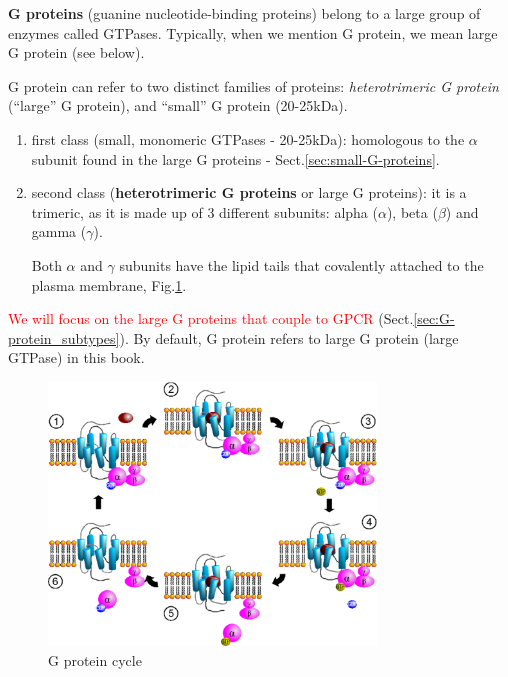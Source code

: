 {\bf G proteins} (guanine nucleotide-binding proteins) belong to a large group
of enzymes called GTPases. Typically, when we mention G protein, we mean
large G protein (see below).

G protein can refer to two distinct families of proteins:
{\it heterotrimeric G protein} (``large'' G protein), and ``small'' G protein
(20-25kDa).

\begin{enumerate}
  \item first class (small, monomeric GTPases - 20-25kDa): homologous to the
  $\alpha$ subunit found in the large G proteins - Sect.\ref{sec:small-G-proteins}.
  
  
  \item second class ({\bf heterotrimeric G proteins} or large G proteins):
  it is a trimeric, as it is made up of 3 different subunits:  alpha ($\alpha$),
  beta ($\beta$) and gamma ($\gamma$).
  
Both $\alpha$ and $\gamma$ subunits have the lipid tails that covalently
attached to the plasma membrane, Fig.\ref{fig:G_protein}.

\end{enumerate} 

\textcolor{red}{We will focus on the large G proteins that couple to GPCR}
(Sect.\ref{sec:G-protein_subtypes}). By default, G protein refers to large G
protein (large GTPase) in this book.


% 



\begin{figure}[hbt]
 \centerline{\includegraphics[height=7cm]{./images/G_protein_cycle.eps}}
\caption{G protein cycle}
\label{fig:G_protein}
\end{figure}

